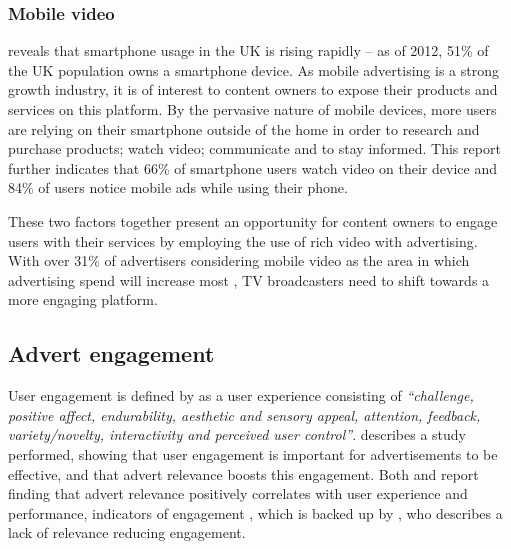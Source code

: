 

	\subsubsection{Mobile video}

		\citet{mobile-planet} reveals that smartphone usage in the UK is rising rapidly -- as of 2012, 51\% of the UK population owns a smartphone device. As mobile advertising is a strong growth industry, it is of interest to content owners to expose their products and services on this platform. By the pervasive nature of mobile devices, more users are relying on their smartphone outside of the home in order to research and purchase products; watch video; communicate and to stay informed. This report further indicates that 66\% of smartphone users watch video on their device and 84\% of users notice mobile ads while using their phone. 

		These two factors together present an opportunity for content owners to engage users with their services by employing the use of rich video with advertising. With over 31\% of advertisers considering mobile video as the area in which advertising spend will increase most \citep{brightroll-report}, TV broadcasters need to shift towards a more engaging platform.

\subsection{Advert engagement}

	User engagement is defined by \citet{what_is_engagement} as a user experience consisting of \textit{``challenge, positive affect, endurability, aesthetic and sensory appeal, attention, feedback, variety/novelty, interactivity and perceived user control''}. \citet{advertising_engagement} describes a study performed, showing that user engagement is important for advertisements to be effective, and that advert relevance boosts this engagement. Both \citet{advertising_engagement} and \citet{yahoo-intrusive-advertising} report finding that advert relevance positively correlates with user experience and performance, indicators of engagement \citep{what_is_engagement}, which is backed up by \citet{plummer2006measures}, who describes a lack of relevance reducing engagement.

